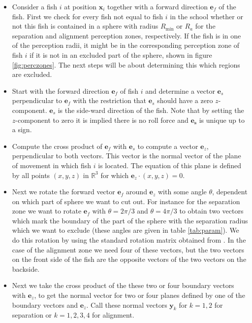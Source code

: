 \documentclass[11pt,a4paper]{article}
\begin{document}
\begin{itemize}
\item 
  Consider a fish $i$ at position $\mathbf{x}_i$ together with a forward direction $\mathbf{e}_f$ of the fish. First we check for every fish not equal to fish $i$ in the school whether or not this fish is contained in a sphere with radius $R_\text{min}$ or $R_a$ for the separation and alignment perception zones, respectively. If the fish is in one of the perception radii, it might be in the corresponding perception zone of fish $i$ if it is not in an excluded part of the sphere, shown in figure \ref{fig:perczones}. The next steps will be about determining this which regions are excluded.
\item
  Start with the forward direction $\mathbf{e}_f$ of fish $i$ and determine a vector $\mathbf{e}_s$ perpendicular to $\mathbf{e}_f$ with the restriction that $\mathbf{e}_s$ should have a zero $z$-component. $\mathbf{e}_s$ is the side-ward direction of the fish. Note that by setting the $z$-component to zero it is implied there is no roll force and $\mathbf{e_s}$ is unique up to a sign.
\item
  Compute the cross product of $\mathbf{e}_f$ with $\mathbf{e}_s$ to compute a vector $\mathbf{e}_z$, perpendicular to both vectors. This vector is the normal vector of the plane of movement in which fish $i$ is located. The equation of this plane is defined by all points $(x,y,z)$ in $\mathbb{R}^3$ for which $\mathbf{e}_z \cdot (x,y,z) = 0$.
\item
  Next we rotate the forward vector $\mathbf{e}_f$ around $\mathbf{e}_z$ with some angle $\theta$, dependent on which part of sphere we want to cut out. For instance for the separation zone we want to rotate $\mathbf{e}_f$ with $\theta = 2\pi/3$ and $\theta = 4\pi/3$ to obtain two vectors which mark the boundary of the part of the sphere with the separation radius which we want to exclude (these angles are given in table \ref{tab:param}). We do this rotation by using the standard rotation matrix obtained from \cite{rotmatrix}. In the case of the alignment zone we need four of these vectors, but the two vectors on the front side of the fish are the opposite vectors of the two vectors on the backside.
\item
  Next we take the cross product of the these two or four boundary vectors with $\mathbf{e}_z$, to get the normal vector for two or four planes defined by one of the boundary vectors and $\mathbf{e}_z$. Call these normal vectors $\mathbf{y}_{k}$ for $k = 1,2$ for separation or $k = 1,2,3,4$ for alignment.

\end{itemize}
\end{document}
